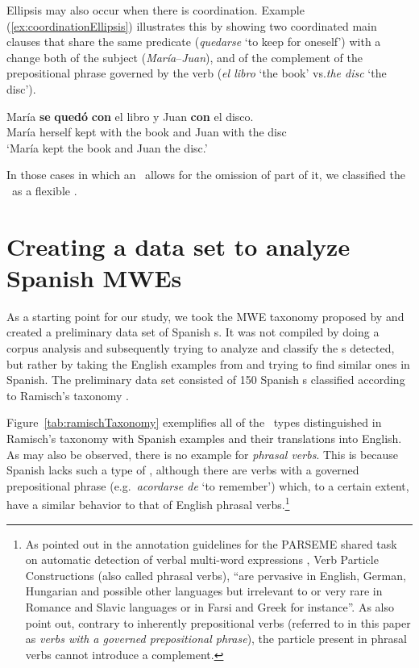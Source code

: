 \documentclass[output=paper]{langsci/langscibook}
\begin{document}
Ellipsis may also occur when there is coordination. 
Example (\ref{ex:coordinationEllipsis}) illustrates this by showing two coordinated main clauses that share the same predicate (\textit{quedarse} `to keep for oneself') with a change both of the subject (\textit{María}--\textit{Juan}), and of the complement of the prepositional phrase governed by the verb (\textit{el libro} `the book' vs.\@ \textit{the disc} `the disc').

\begin{exe}
\ex \label{ex:coordinationEllipsis}
\gll María \textbf{se} \textbf{quedó} \textbf{con} el libro y Juan \textbf{con} el disco. \\
María herself kept with the book and Juan with the disc\\
\glt `María kept the book and Juan the disc.'
\end{exe}

In those cases in which an \mwe\ allows for the omission of part of it, we classified the \mwe\ as a flexible \mwe.

\section{Creating a data set to analyze Spanish MWEs}
\label{sec:dataset}

As a starting point for our study, we took the MWE taxonomy  proposed by \citet{Ramisch:2012,Ramisch:2015} and created a preliminary data set of Spanish \mwe s.
It was not compiled by doing a corpus analysis and subsequently trying to analyze and classify the \mwe s detected, but rather by taking the English examples from \citet{Ramisch:2012,Ramisch:2015} and trying to find similar ones in Spanish.
The preliminary data set consisted of 150 Spanish \mwe s classified according to Ramisch’s taxonomy \citep{Parra:2015}. 

Figure~\ref{tab:ramischTaxonomy}  
exemplifies all of the \mwe\ types distinguished in Ramisch's taxonomy with Spanish examples and their translations into English.
As may also be observed, there is no example for \textit{phrasal verbs}. 
This is because Spanish lacks such a type of \mwe, although there are verbs with a governed prepositional phrase (e.g.\ \textit{acordarse de} `to remember') which, to a certain extent, have a similar behavior to that of English phrasal verbs.\footnote{As pointed out in the annotation guidelines for the PARSEME shared task on automatic detection of verbal multi-word expressions \citep{Vincze:2016}, Verb Particle Constructions (also called phrasal verbs), ``are pervasive in English, German, Hungarian and possible other languages but irrelevant to or very rare in Romance and Slavic languages or in Farsi and Greek for instance''. As \cite{Vincze:2016} also point out, contrary to inherently prepositional verbs (referred to in this paper as \textit{verbs with a governed prepositional phrase}), the particle present in phrasal verbs cannot introduce a complement.}
\end{document}
